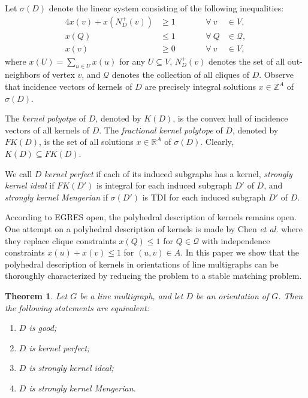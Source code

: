 \documentclass[11pt]{article}
\newtheorem{theorem}{Theorem}%
\numberwithin{theorem}{section}
\begin{document}
Let $\sigma(D)$ denote the linear system consisting of the following inequalities:
\begin{alignat}{4}
x(v)+x(N^+_{D}(v)) &\geq 1 &\qquad &\forall ~ v~&\in V, \label{domination constraints}\\
x(Q)&\leq 1 &\qquad &\forall ~ Q &\in \mathcal{Q}, \label{independence constraints}\\
x(v) &\geq 0 &\qquad &\forall ~ v~&\in V, \label{vertex nonnegativity}
\end{alignat}
where $x(U)=\sum_{u\in U}x(u)$ for any $U\subseteq V$, $N_D^+(v)$ denotes the set of all out-neighbors of vertex $v$, and $\mathcal{Q}$ denotes the collection of all cliques of $D$. Observe that incidence vectors of kernels of $D$ are precisely integral solutions $x\in \mathbb{Z}^A$ of $\sigma(D)$.

The \textit{kernel polyotpe} of $D$, denoted by $K(D)$, is the convex hull of incidence vectors of all kernels of $D$.  The \textit{fractional kernel polytope} of $D$, denoted by $FK(D)$, is the set of all solutions $x\in \mathbb{R}^A$ of $\sigma(D)$. Clearly, $K(D)\subseteq FK(D)$.

We call $D$ \textit{kernel perfect} if each of its induced subgraphs has a kernel, \textit{strongly kernel ideal} if $FK(D')$ is integral for each induced subgraph $D'$ of $D$, and \textit{strongly kernel Mengerian} if $\sigma(D')$ is TDI for each induced subgraph $D'$ of $D$.

According to EGRES open, the polyhedral description of kernels remains open. One attempt on a polyhedral description of kernels is made by Chen \textit{et al.} \cite{ChenChen16} where they replace clique constraints $x(Q)\leq 1$ for $Q\in\mathcal{Q}$ with independence constraints $x(u)+x(v)\leq 1$ for $(u,v)\in A$. In this paper we show that the polyhedral description of kernels in orientations of line multigraphs can be thoroughly characterized by reducing the problem to a stable matching problem.

\begin{theorem}
\label{thm:main}
Let $G$ be a line multigraph, and let $D$ be an orientation of $G$. Then the following statements are equivalent:
\begin{enumerate}[label={\emph{(}\roman*\emph{)}}]
	\item $D$ is good;
	\item $D$ is kernel perfect;
	\item $D$ is strongly kernel ideal;
	\item $D$ is strongly kernel Mengerian.
\end{enumerate}
\end{theorem}
\end{document}

